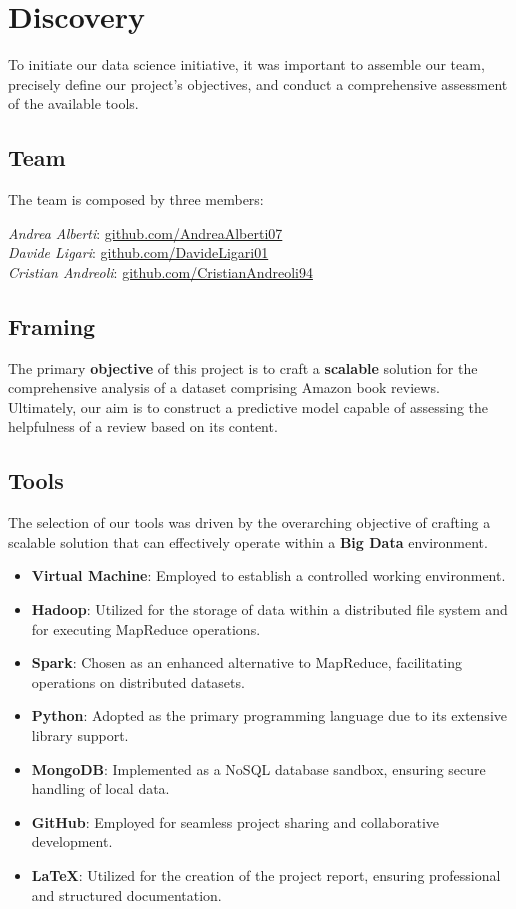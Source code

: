 \section{Discovery}
To initiate our data science initiative, it was important to assemble our team, precisely define our project's objectives, 
and conduct a comprehensive assessment of the available tools.

\subsection*{Team}
The team is composed by three members:

\noindent
\textit{Andrea Alberti}: \href{https://github.com/AndreaAlberti07}{github.com/AndreaAlberti07}\\
\textit{Davide Ligari}: \href{https://github.com/DavideLigari01}{github.com/DavideLigari01}\\
\textit{Cristian Andreoli}: \href{https://github.com/CristianAndreoli94}{github.com/CristianAndreoli94}\\

\subsection*{Framing}
The primary \textbf{objective} of this project is to craft a \textbf{scalable} solution for the comprehensive analysis of a dataset comprising 
Amazon book reviews. Ultimately, our aim is to construct a predictive model capable of assessing the helpfulness of a review based on its content.

\subsection*{Tools}
The selection of our tools was driven by the overarching objective of crafting a scalable solution that can effectively operate within a \textbf{Big Data} environment.

\begin{itemize}[leftmargin=*, noitemsep]
    \item \textbf{Virtual Machine}: Employed to establish a controlled working environment.
    \item \textbf{Hadoop}: Utilized for the storage of data within a distributed file system and for executing MapReduce operations.
    \item \textbf{Spark}: Chosen as an enhanced alternative to MapReduce, facilitating operations on distributed datasets.
    \item \textbf{Python}: Adopted as the primary programming language due to its extensive library support.
    \item \textbf{MongoDB}: Implemented as a NoSQL database sandbox, ensuring secure handling of local data.
    \item \textbf{GitHub}: Employed for seamless project sharing and collaborative development.
    \item \textbf{LaTeX}: Utilized for the creation of the project report, ensuring professional and structured documentation.
\end{itemize}






